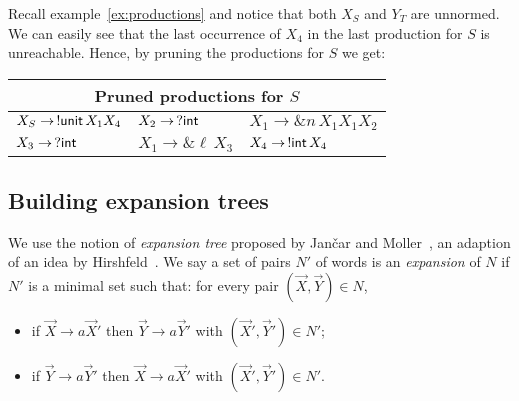 \begin{example}
  \label{ex:prune}
  Recall example~\ref{ex:productions} and notice that both
  $X_S$ and
  $Y_T$ are unnormed. We can easily see that the last occurrence of
  $X_4$ in the last production for
  $S$ is unreachable. Hence, by pruning the productions for
  $S$ we get:
  \begin{center}
    \begin{tabular}{l l l}
      \multicolumn{3}{c}{Pruned productions for $S$}\\ \hline
      $X_S \rightarrow \,!\mathsf{unit}\, X_1 X_4$ &
      $X_2 \rightarrow \,? \mathsf{int}$ &
      $X_1 \rightarrow \& n\, X_1 X_1 X_2$
      \\
      $X_3 \rightarrow \,? \mathsf{int}$ &
      $X_1 \rightarrow \& \ell\, X_3$ &
      $X_4 \rightarrow \,!\mathsf{int}\, X_4$
    \end{tabular}
  \end{center}
\end{example}

\subsection{Building expansion trees}
\label{subsec:expand}


We use the notion of \emph{expansion tree} proposed by Jan{\v{c}}ar
and Moller~\cite{janvcar1999techniques}, an adaption of an idea by
Hirshfeld~\cite{hirshfeld1996bisimulation}. We say a set of pairs $N'$
of words is an \emph{expansion} of $N$ if $N'$ is a minimal set such
that: for every pair $(\vec X, \vec Y) \in N$,
\begin{itemize}
\item if $\vec X \rightarrow a\vec X'$ then
  $\vec Y \rightarrow a\vec Y'$ with $(\vec X',\vec Y')\in N'$;
\item if $\vec Y \rightarrow a\vec Y'$ then
  $\vec X \rightarrow a \vec X'$ with $(\vec X',\vec Y')\in N'$.
\end{itemize}

